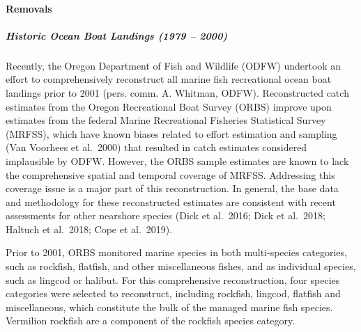 \documentclass[11pt,
  english,
  a4paper,
]{article}
\begin{document}
\hypertarget{removals}{%
\paragraph{Removals}\label{removals}}

\leavevmode\tagmcend\tagstructend


\hypertarget{historic-ocean-boat-landings-1979-2000}{%
\subparagraph{Historic Ocean Boat Landings (1979 -- 2000)}\label{historic-ocean-boat-landings-1979-2000}}

\leavevmode\tagmcend\tagstructend


Recently, the Oregon Department of Fish and Wildlife (ODFW) undertook an effort to comprehensively reconstruct all marine fish recreational ocean boat landings prior to 2001 (pers. comm. A. Whitman, ODFW). Reconstructed catch estimates from the Oregon Recreational Boat Survey (ORBS) improve upon estimates from the federal Marine Recreational Fisheries Statistical Survey (MRFSS), which have known biases related to effort estimation and sampling (Van Voorhees et al.~2000) that resulted in catch estimates considered implausible by ODFW. However, the ORBS sample estimates are known to lack the comprehensive spatial and temporal coverage of MRFSS. Addressing this coverage issue is a major part of this reconstruction. In general, the base data and methodology for these reconstructed estimates are consistent with recent assessments for other nearshore species (Dick et al.~2016; Dick et al.~2018; Haltuch et al.~2018; Cope et al.~2019).

\leavevmode\tagmcend\tagstructend\par


Prior to 2001, ORBS monitored marine species in both multi-species categories, such as rockfish, flatfish, and other miscellaneous fishes, and as individual species, such as lingcod or halibut. For this comprehensive reconstruction, four species categories were selected to reconstruct, including rockfish, lingcod, flatfish and miscellaneous, which constitute the bulk of the managed marine fish species. Vermilion rockfish are a component of the rockfish species category.

\leavevmode\tagmcend\tagstructend\par
\end{document}
